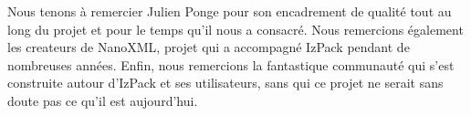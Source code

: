 Nous tenons à remercier Julien Ponge pour son encadrement de qualité tout au long du projet et pour le temps qu'il nous a consacré.
Nous remercions également les createurs de NanoXML, projet qui a accompagné IzPack pendant de nombreuses années.
Enfin, nous remercions la fantastique communauté qui s'est construite autour d'IzPack et ses utilisateurs, sans qui ce projet ne serait sans doute pas ce qu'il est aujourd'hui.